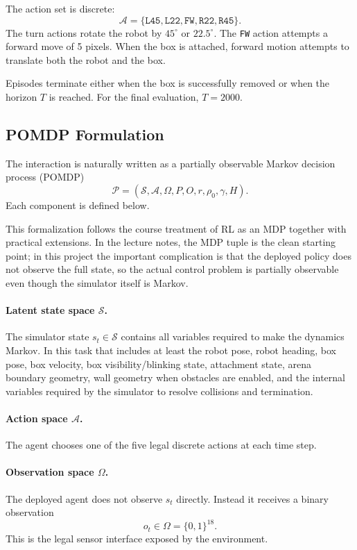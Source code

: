 \documentclass[11pt]{article}
\begin{document}
The action set is discrete:
\[
  \mathcal{A} = \{\texttt{L45},\texttt{L22},\texttt{FW},\texttt{R22},\texttt{R45}\}.
\]
The turn actions rotate the robot by \(45^\circ\) or \(22.5^\circ\). The \texttt{FW} action
attempts a forward move of 5 pixels. When the box is attached, forward motion attempts
to translate both the robot and the box.

Episodes terminate either when the box is successfully removed or when the horizon
\(T\) is reached. For the final evaluation, \(T=2000\).

\subsection{POMDP Formulation}

The interaction is naturally written as a partially observable Markov decision process
(POMDP)
\[
  \mathcal{P}=(\mathcal{S},\mathcal{A},\Omega,P,O,r,\rho_0,\gamma,H).
\]
Each component is defined below.

This formalization follows the course treatment of RL as an MDP together with practical
extensions. In the lecture notes, the MDP tuple is the clean starting point; in this
project the important complication is that the deployed policy does not observe the full
state, so the actual control problem is partially observable even though the simulator
itself is Markov.

\paragraph{Latent state space \(\mathcal{S}\).}
The simulator state
\(s_t\in\mathcal{S}\) contains all variables required to make the dynamics Markov. In
this task that includes at least the robot pose, robot heading, box pose, box velocity,
box visibility/blinking state, attachment state, arena boundary geometry, wall geometry
when obstacles are enabled, and the internal variables required by the simulator to
resolve collisions and termination.

\paragraph{Action space \(\mathcal{A}\).}
The agent chooses one of the five legal discrete actions at each time step.

\paragraph{Observation space \(\Omega\).}
The deployed agent does not observe \(s_t\) directly. Instead it receives a binary
observation
\[
  o_t\in\Omega=\{0,1\}^{18}.
\]
This is the legal sensor interface exposed by the environment.
\end{document}
